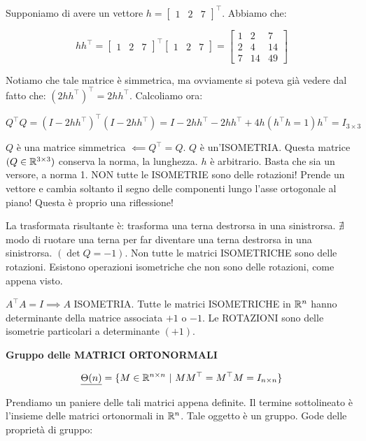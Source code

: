 Supponiamo di avere un vettore $h = \begin{bmatrix}1&2&7\end{bmatrix}^\top$. Abbiamo che:

\[
	hh^\top = \begin{bmatrix}1&2&7\end{bmatrix}^\top \begin{bmatrix}1&2&7\end{bmatrix} = \begin{bmatrix}1&2&7\\2&4&14\\7&14&49\end{bmatrix}
\]

Notiamo che tale matrice è simmetrica, ma ovviamente si poteva già vedere dal fatto che: $(2hh^\top)^\top = 2hh^\top$. Calcoliamo ora:

\[
	Q^\top Q = (I-2hh^\top)^\top (I-2hh^\top) = I - 2hh^\top - 2hh^\top + 4h(h^\top h = 1)h^\top = I_{3\times 3}
\]

$Q$ è una matrice simmetrica $\impliedby Q^\top = Q$. $Q$ è un'ISOMETRIA. Questa matrice $(Q\in\mathbb{R}^{3\times 3})$ conserva la norma, la lunghezza. $h$ è arbitrario. Basta che sia un versore, a norma 1. NON tutte le ISOMETRIE sono delle rotazioni! Prende un vettore e cambia soltanto il segno delle componenti lungo l'asse ortogonale al piano! Questa è proprio una riflessione!

La trasformata risultante è: trasforma una terna destrorsa in una sinistrorsa. $\nexists$ modo di ruotare una terna per far diventare una terna destrorsa in una sinistrorsa. $(\det{Q}=-1)$. Non tutte le matrici ISOMETRICHE sono delle rotazioni. Esistono operazioni isometriche che non sono delle rotazioni, come appena visto.

$A^\top A = I \implies A$ ISOMETRIA. Tutte le matrici ISOMETRICHE in $\mathbb{R}^n$ hanno determinante della matrice associata $+1$ o $-1$. Le ROTAZIONI sono delle isometrie particolari a determinante $(+1)$.

\begin{defn}{\textbf{Gruppo delle MATRICI ORTONORMALI}}

\[
	\underline{\Theta(n)} = \{M\in\mathbb{R}^{n\times n}\ |\ MM^\top = M^\top M = I_{n\times n}\}
\]

\end{defn}

Prendiamo un paniere delle tali matrici appena definite. Il termine sottolineato è l'insieme delle matrici ortonormali in $\mathbb{R}^n$. Tale oggetto è un gruppo. Gode delle proprietà di gruppo:

